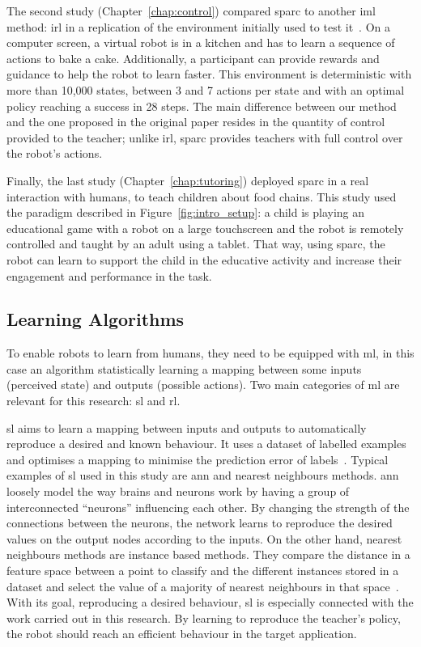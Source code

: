 The second study (Chapter~\ref{chap:control}) compared \gls{sparc} to another \gls{iml} method: \gls{irl} in a replication of the environment initially used to test it~\citep{thomaz2008teachable}. On a computer screen, a virtual robot is in a kitchen and has to learn a sequence of actions to bake a cake. Additionally, a participant can provide rewards and guidance to help the robot to learn faster. This environment is deterministic with more than 10,000 states, between 3 and 7 actions per state and with an optimal policy reaching a success in 28 steps. The main difference between our method and the one proposed in the original paper resides in the quantity of control provided to the teacher; unlike \gls{irl}, \gls{sparc} provides teachers with full control over the robot's actions. 

Finally, the last study (Chapter~\ref{chap:tutoring}) deployed \gls{sparc} in a real interaction with humans, to teach children about food chains. This study used the paradigm described in Figure~\ref{fig:intro_setup}: a child is playing an educational game with a robot on a large touchscreen and the robot is remotely controlled and taught by an adult using a tablet. That way, using \gls{sparc}, the robot can learn to support the child in the educative activity and increase their engagement and performance in the task.

\subsection{Learning Algorithms}

To enable robots to learn from humans, they need to be equipped with \acrfull{ml}, in this case an algorithm statistically learning a mapping between some inputs (perceived state) and outputs (possible actions). Two main categories of \gls{ml} are relevant for this research: \gls{sl} and \gls{rl}.

\gls{sl} aims to learn a mapping between inputs and outputs to automatically reproduce a desired and known behaviour. It uses a dataset of labelled examples and optimises a mapping to minimise the prediction error of labels~\citep{russell2016artificial}. Typical examples of \gls{sl} used in this study are \gls{ann} and nearest neighbours methods. \gls{ann} loosely model the way brains and neurons work by having a group of interconnected ``neurons'' influencing each other. By changing the strength of the connections between the neurons, the network learns to reproduce the desired values on the output nodes according to the inputs. On the other hand, nearest neighbours methods are instance based methods. They compare the distance in a feature space between a point to classify and the different instances stored in a dataset and select the value of a majority of nearest neighbours in that space~\citep{cover1967nearest}. With its goal, reproducing a desired behaviour, \gls{sl} is especially connected with the work carried out in this research. By learning to reproduce the teacher's policy, the robot should reach an efficient behaviour in the target application.

